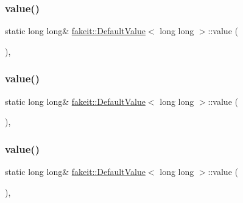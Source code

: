 \subsubsection{\texorpdfstring{value()}{value()}\hspace{0.1cm}{\footnotesize\ttfamily [1/9]}}
{\footnotesize\ttfamily static long long\& \mbox{\hyperlink{structfakeit_1_1DefaultValue}{fakeit\+::\+Default\+Value}}$<$ long long $>$\+::value (\begin{DoxyParamCaption}{ }\end{DoxyParamCaption})\hspace{0.3cm}{\ttfamily [inline]}, {\ttfamily [static]}}

\mbox{\label{structfakeit_1_1DefaultValue_3_01long_01long_01_4_ab955d01985ff900b3e625a53cf2a5607}} 
\subsubsection{\texorpdfstring{value()}{value()}\hspace{0.1cm}{\footnotesize\ttfamily [2/9]}}
{\footnotesize\ttfamily static long long\& \mbox{\hyperlink{structfakeit_1_1DefaultValue}{fakeit\+::\+Default\+Value}}$<$ long long $>$\+::value (\begin{DoxyParamCaption}{ }\end{DoxyParamCaption})\hspace{0.3cm}{\ttfamily [inline]}, {\ttfamily [static]}}

\mbox{\label{structfakeit_1_1DefaultValue_3_01long_01long_01_4_ab955d01985ff900b3e625a53cf2a5607}} 
\subsubsection{\texorpdfstring{value()}{value()}\hspace{0.1cm}{\footnotesize\ttfamily [3/9]}}
{\footnotesize\ttfamily static long long\& \mbox{\hyperlink{structfakeit_1_1DefaultValue}{fakeit\+::\+Default\+Value}}$<$ long long $>$\+::value (\begin{DoxyParamCaption}{ }\end{DoxyParamCaption})\hspace{0.3cm}{\ttfamily [inline]}, {\ttfamily [static]}}


